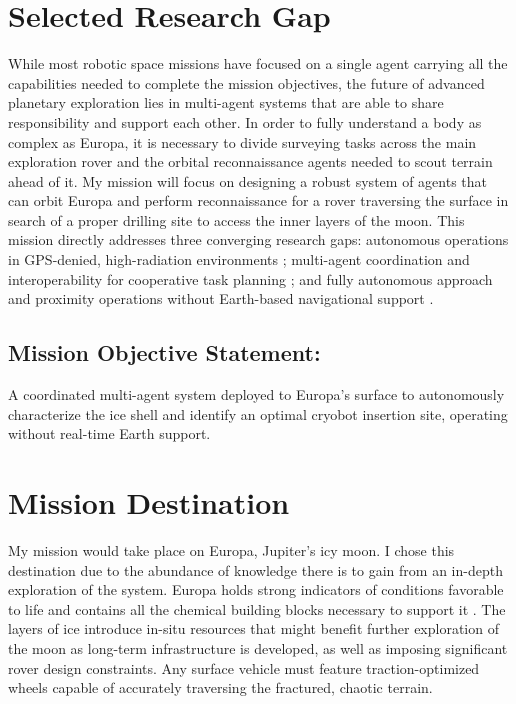 \documentclass[11pt]{article}
\begin{document}
\section*{Selected Research Gap}

While most robotic space missions have focused on a single agent carrying all the capabilities needed to complete the
mission objectives, the future of advanced planetary exploration lies in multi-agent systems that are able to share
responsibility and support each other. In order to fully understand a body as complex as Europa, it is necessary to
divide surveying tasks across the main exploration rover and the orbital reconnaissance agents needed to scout terrain
ahead of it. My mission will focus on designing a robust system of agents that can orbit Europa and perform reconnaissance
for a rover traversing the surface in search of a proper drilling site to access the inner layers of the moon. This mission
directly addresses three converging research gaps: autonomous operations in GPS-denied, high-radiation environments
\cite{owlDecadal}; multi-agent coordination and interoperability for cooperative task planning \cite{stmdShortfall};
and fully autonomous approach and proximity operations without Earth-based navigational support \cite{nasaSBIR}.

\subsection*{Mission Objective Statement:}
A coordinated multi-agent system deployed to Europa's surface to autonomously characterize the
ice shell and identify an optimal cryobot insertion site, operating without real-time Earth
support.

\section*{Mission Destination}

My mission would take place on Europa, Jupiter's icy moon. I chose this destination due to the abundance of knowledge
there is to gain from an in-depth exploration of the system. Europa holds strong indicators of conditions favorable to
life and contains all the chemical building blocks necessary to support it \cite{owlDecadal}. The layers of ice
introduce in-situ resources that might benefit further exploration of the moon as long-term infrastructure is developed,
as well as imposing significant rover design constraints. Any surface vehicle must feature traction-optimized wheels
capable of accurately traversing the fractured, chaotic terrain.
\end{document}
